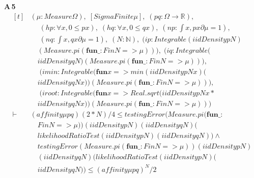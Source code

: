 \noindent\textbf{A\,5}\quad{}
{\footnotesize\[ \begin{aligned}[t]
&(\mu : \mathit{Measure} \Omega ),\; [\mathit{SigmaFinite} \mu ],\; (\mathit{p} \mathit{q} : \Omega \to \mathbb{R} ),\\
&\quad \; (\mathit{hp} : \forall \mathit{x}, 0 \leq \mathit{p} \mathit{x}),\; (\mathit{hq} : \forall \mathit{x}, 0 \leq \mathit{q} \mathit{x}),\; (\mathit{np} : \int \mathit{x}, \mathit{p} \mathit{x} ∂\mu = 1),\\
&\quad \; (\mathit{nq} : \int \mathit{x}, \mathit{q} \mathit{x} ∂\mu = 1),\; (\mathit{N} : \mathbb{N} ),\; (\mathit{ip} : \mathit{Integrable} (\mathit{iidDensity} \mathit{p} \mathit{N})\\
&\quad (\mathit{Measure}.\mathit{pi} (\mathbf{fun} \mathit{\_} : \mathit{Fin} \mathit{N} => \mu ))),\; (\mathit{iq} : \mathit{Integrable} (\\
&\quad \mathit{iidDensity} \mathit{q} \mathit{N}) (\mathit{Measure}.\mathit{pi} (\mathbf{fun} \mathit{\_} : \mathit{Fin} \mathit{N} => \mu ))),\\
&\quad \; (\mathit{imin} : \mathit{Integrable} (\mathbf{fun} \mathit{x} => \mathit{min} (\mathit{iidDensity} \mathit{p} \mathit{N} \mathit{x}) (\\
&\quad \mathit{iidDensity} \mathit{q} \mathit{N} \mathit{x})) (\mathit{Measure}.\mathit{pi} (\mathbf{fun} \mathit{\_} : \mathit{Fin} \mathit{N} => \mu ))),\\
&\quad \; (\mathit{iroot} : \mathit{Integrable} (\mathbf{fun} \mathit{x} => \mathit{Real}.\mathit{sqrt} (\mathit{iidDensity} \mathit{p} \mathit{N} \mathit{x}*\\
&\quad \mathit{iidDensity} \mathit{q} \mathit{N} \mathit{x})) (\mathit{Measure}.\mathit{pi} (\mathbf{fun} \mathit{\_} : \mathit{Fin} \mathit{N} => \mu )))\\
\vdash\;&(\mathit{affinity} \mu \mathit{p} \mathit{q})^{}(2*\mathit{N})/4 \leq \mathit{testingError} (\mathit{Measure}.\mathit{pi} (\mathbf{fun} \mathit{\_} :\\
&\quad \mathit{Fin} \mathit{N} => \mu )) (\mathit{iidDensity} \mathit{p} \mathit{N}) (\mathit{iidDensity} \mathit{q} \mathit{N}) (\\
&\quad \mathit{likelihoodRatioTest} (\mathit{iidDensity} \mathit{p} \mathit{N}) (\mathit{iidDensity} \mathit{q} \mathit{N})) \wedge\\
&\quad \mathit{testingError} (\mathit{Measure}.\mathit{pi} (\mathbf{fun} \mathit{\_} : \mathit{Fin} \mathit{N} => \mu )) (\mathit{iidDensity} \mathit{p} \mathit{N})\\
&\quad (\mathit{iidDensity} \mathit{q} \mathit{N}) (\mathit{likelihoodRatioTest} (\mathit{iidDensity} \mathit{p} \mathit{N}) (\\
&\quad \mathit{iidDensity} \mathit{q} \mathit{N})) \leq (\mathit{affinity} \mu \mathit{p} \mathit{q})^{\mathit{N}}/2
\end{aligned} \]}

